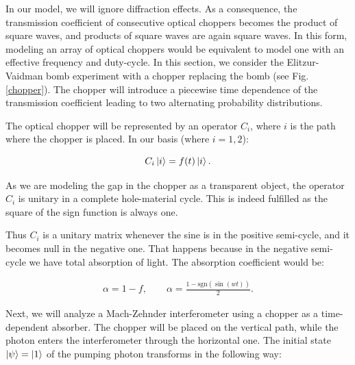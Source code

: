 \documentclass[12pt]{book}
\begin{document}
In our model, we will ignore diffraction effects. As a consequence, the transmission coefficient of consecutive optical choppers becomes the product of square waves, and products of square waves are again square waves. In this form, modeling an array of optical choppers would be equivalent to model one with an effective frequency and duty-cycle. In this section, we consider the Elitzur-Vaidman bomb experiment with a chopper replacing the bomb (see Fig. \ref{chopper}). The chopper will introduce a piecewise time dependence of the transmission coefficient leading to two alternating probability distributions.


The optical chopper will be represented by an operator $C_{i}$, where $i$ is the path where the chopper is placed. In our basis (where $i=1,2$):

\begin{equation}
C_{i}\ket{i}=f(t)\ket{i}.
\end{equation}

As we are modeling the gap in the chopper as a transparent object, the operator $C_i$ is unitary in a complete hole-material cycle.  This is indeed fulfilled as the square of the sign function is always one.


Thus $C_{i}$ is a unitary matrix whenever the sine is in the positive semi-cycle, and it becomes null in the negative one. That happens because in the negative semi-cycle we have total absorption of light. The absorption coefficient would  be:  

\begin{align}
 \alpha=1-f,\qquad \alpha=\frac{1-\mathrm{sgn}(\sin(wt))}{2}.
\end{align}

Next, we will analyze a Mach-Zehnder interferometer using a chopper as a time-dependent absorber. The chopper will be placed on the vertical path, while the photon enters the interferometer through the horizontal one. The initial state $\ket{\psi}=\ket{1}$ of the pumping photon transforms in the following way:
\end{document}
